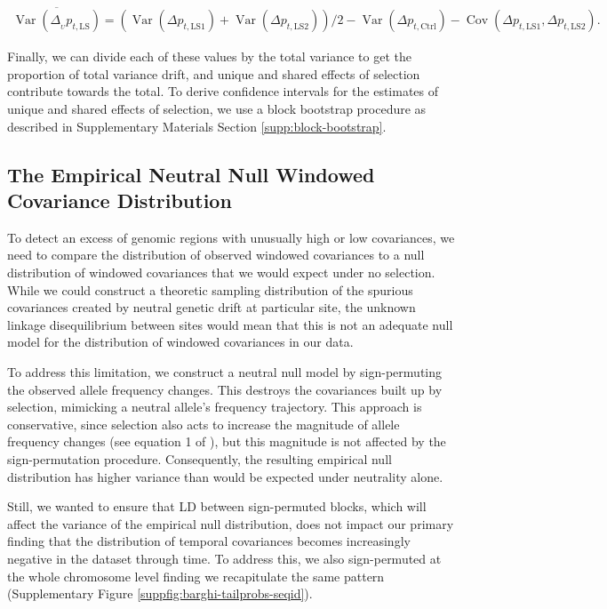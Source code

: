 \documentclass[11pt]{article}
\DeclareMathOperator{\var}{Var}
\DeclareMathOperator{\cov}{Cov}
\begin{document}
{\begin{align}
  \overline{\var(\Delta_{_U} p_{t,\mathrm{LS}})}  = 
(\var(\Delta p_{t,\mathrm{LS1}}) + \var(\Delta p_{t,\mathrm{LS2}}))/2 - \var(\Delta p_{t,\mathrm{Ctrl}}) - \cov(\Delta p_{t,\mathrm{LS1}}, \Delta p_{t,\mathrm{LS2}}).
\end{align}

Finally, we can divide each of these values by the total variance to get the
proportion of total variance drift, and unique and shared effects of selection
contribute towards the total. To derive confidence intervals for the estimates
of unique and shared effects of selection, we use a block bootstrap procedure
as described in Supplementary Materials Section \ref{supp:block-bootstrap}.

\subsection{The Empirical Neutral Null Windowed Covariance Distribution}
\label{supp:empirical-null}

To detect an excess of genomic regions with unusually high or low covariances,
we need to compare the distribution of observed windowed covariances to a null
distribution of windowed covariances that we would expect under no selection.
While we could construct a theoretic sampling distribution of the spurious
covariances created by neutral genetic drift at particular site, the unknown
linkage disequilibrium between sites would mean that this is not an adequate
null model for the distribution of windowed covariances in our data. 

To address this limitation, we construct a neutral null model by sign-permuting
the observed allele frequency changes. This destroys the covariances built up
by selection, mimicking a neutral allele's frequency trajectory. This approach
is conservative, since selection also acts to increase the magnitude of allele
frequency changes (see equation 1 of \cite{Buffalo2019-io}), but this magnitude
is not affected by the sign-permutation procedure. Consequently, the resulting
empirical null distribution has higher variance than would be expected under
neutrality alone.

Still, we wanted to ensure that LD between sign-permuted blocks, which will
affect the variance of the empirical null distribution, does not impact our
primary finding that the distribution of temporal covariances becomes
increasingly negative in the \textcite{Barghi2019-qy} dataset through time. To
address this, we also sign-permuted at the whole chromosome level finding we
recapitulate the same pattern (Supplementary Figure
\ref{suppfig:barghi-tailprobs-seqid}).

}
\end{document}
